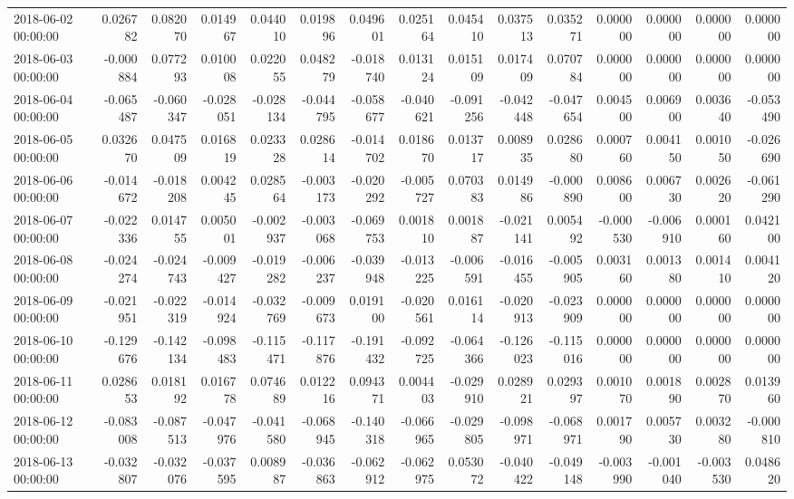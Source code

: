 \begin{tabular}{lrrrrrrrrrrrrrr}
2018-06-02 00:00:00 & 0.026782 & 0.082070 & 0.014967 & 0.044010 & 0.019896 & 0.049601 & 0.025164 & 0.045410 & 0.037513 & 0.035271 & 0.000000 & 0.000000 & 0.000000 & 0.000000 \\
2018-06-03 00:00:00 & -0.000884 & 0.077293 & 0.010008 & 0.022055 & 0.048279 & -0.018740 & 0.013124 & 0.015109 & 0.017409 & 0.070784 & 0.000000 & 0.000000 & 0.000000 & 0.000000 \\
2018-06-04 00:00:00 & -0.065487 & -0.060347 & -0.028051 & -0.028134 & -0.044795 & -0.058677 & -0.040621 & -0.091256 & -0.042448 & -0.047654 & 0.004500 & 0.006900 & 0.003640 & -0.053490 \\
2018-06-05 00:00:00 & 0.032670 & 0.047509 & 0.016819 & 0.023328 & 0.028614 & -0.014702 & 0.018670 & 0.013717 & 0.008935 & 0.028680 & 0.000760 & 0.004150 & 0.001050 & -0.026690 \\
2018-06-06 00:00:00 & -0.014672 & -0.018208 & 0.004245 & 0.028564 & -0.003173 & -0.020292 & -0.005727 & 0.070383 & 0.014986 & -0.000890 & 0.008600 & 0.006730 & 0.002620 & -0.061290 \\
2018-06-07 00:00:00 & -0.022336 & 0.014755 & 0.005001 & -0.002937 & -0.003068 & -0.069753 & 0.001810 & 0.001887 & -0.021141 & 0.005492 & -0.000530 & -0.006910 & 0.000160 & 0.042100 \\
2018-06-08 00:00:00 & -0.024274 & -0.024743 & -0.009427 & -0.019282 & -0.006237 & -0.039948 & -0.013225 & -0.006591 & -0.016455 & -0.005905 & 0.003160 & 0.001380 & 0.001410 & 0.004120 \\
2018-06-09 00:00:00 & -0.021951 & -0.022319 & -0.014924 & -0.032769 & -0.009673 & 0.019100 & -0.020561 & 0.016114 & -0.020913 & -0.023909 & 0.000000 & 0.000000 & 0.000000 & 0.000000 \\
2018-06-10 00:00:00 & -0.129676 & -0.142134 & -0.098483 & -0.115471 & -0.117876 & -0.191432 & -0.092725 & -0.064366 & -0.126023 & -0.115016 & 0.000000 & 0.000000 & 0.000000 & 0.000000 \\
2018-06-11 00:00:00 & 0.028653 & 0.018192 & 0.016778 & 0.074689 & 0.012216 & 0.094371 & 0.004403 & -0.029910 & 0.028921 & 0.029397 & 0.001070 & 0.001890 & 0.002870 & 0.013960 \\
2018-06-12 00:00:00 & -0.083008 & -0.087513 & -0.047976 & -0.041580 & -0.068945 & -0.140318 & -0.066965 & -0.029805 & -0.098971 & -0.068971 & 0.001790 & 0.005730 & 0.003280 & -0.000810 \\
2018-06-13 00:00:00 & -0.032807 & -0.032076 & -0.037595 & 0.008987 & -0.036863 & -0.062912 & -0.062975 & 0.053072 & -0.040422 & -0.049148 & -0.003990 & -0.001040 & -0.003530 & 0.048620 \\

\end{tabular}
